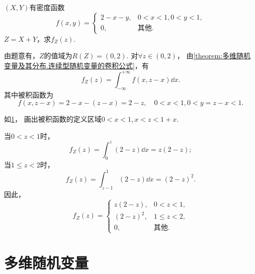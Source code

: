 \begin{example}
\((X,Y)\)有密度函数\[
	f(x,y) = \begin{cases}
		2-x-y, & 0<x<1,0<y<1, \\
		0, & \text{其他}.
	\end{cases}
\]
\(Z=X+Y\)，求\(f_Z(z)\).
\begin{solution}
由题意有，\(Z\)的值域为\(R(Z)=(0,2)\).
对\(\forall z\in(0,2)\)，
由\cref{theorem:多维随机变量及其分布.连续型随机变量的卷积公式}，有\[
	f_Z(z) = \int_{-\infty}^{+\infty} f(x,z-x) \dd{x}.
\]
其中被积函数为\[
	f(x,z-x)
	= 2-x-(z-x)
	= 2-z,
	\quad
	0<x<1,0<y=z-x<1.
\]
\begin{figure}[ht]
	\centering
	\caption{}
	\label{figure:多维随机变量及其分布.二维连续型随机变量函数的分布.例4}
\end{figure}

如\cref{figure:多维随机变量及其分布.二维连续型随机变量函数的分布.例4}，
画出被积函数的定义区域\(0<x<1,x<z<1+x\).

当\(0<z<1\)时，\[
	f_Z(z) = \int_0^z (2-z) \dd{x} = z(2-z);
\]
当\(1\leq z<2\)时，\[
	f_Z(z) = \int_{z-1}^1 (2-z) \dd{x} = (2-z)^2.
\]
因此，\[
	f_Z(z) = \begin{cases}
		z(2-z), & 0<z<1, \\
		(2-z)^2, & 1\leq z<2, \\
		0, & \text{其他}.
	\end{cases}
\]
\end{solution}
\end{example}

\section{多维随机变量}

